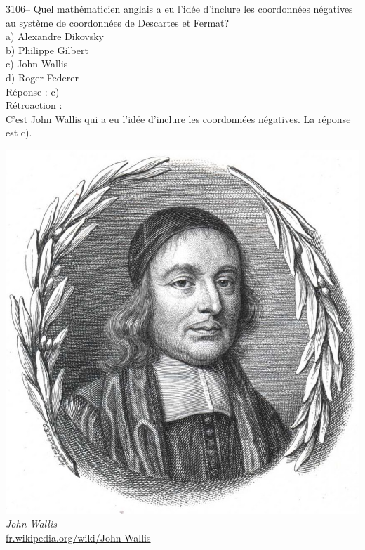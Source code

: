 \documentclass[letterpaper, 12pt]{article}
\begin{document}
3106-- Quel math\'ematicien anglais a eu l'id\'ee d'inclure les coordonn\'ees n\'egatives au syst\`eme de coordonn\'ees de Descartes et Fermat?\\

a) Alexandre Dikovsky\\
b) Philippe Gilbert\\
c) John Wallis\\
d) Roger Federer\\

R\'eponse : c)\\

R\'etroaction :\\
C'est John Wallis qui a eu l'id\'ee d'inclure les coordonn\'ees n\'egatives. La r\'eponse est c).
\begin{center}
\includegraphics[scale=0.15]{John_Wallis.eps}\\
\emph{{\small John Wallis}}\\
\href{http://fr.wikipedia.org/wiki/John_Wallis}{fr.wikipedia.org/wiki/John Wallis}\\[5mm]
\end{center}
\end{document}
